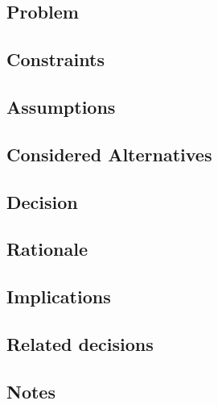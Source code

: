 \subsection*{Problem}

\subsection*{Constraints}

\subsection*{Assumptions}

\subsection*{Considered Alternatives}

\subsection*{Decision}

\subsection*{Rationale}

\subsection*{Implications}

\subsection*{Related decisions}

\subsection*{Notes}